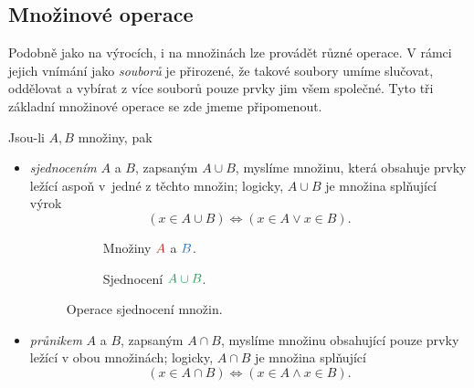 \subsection{Množinové operace}
\label{ssec:mnozinove-operace}

Podobně jako na výrocích, i na množinách lze provádět různé operace. V rámci
jejich vnímání jako \emph{souborů} je přirozené, že takové soubory umíme
slučovat, oddělovat a vybírat z více souborů pouze prvky jim všem společné. Tyto
tři základní množinové operace se zde jmeme připomenout.

Jsou-li $A,B$ množiny, pak
\begin{itemize}
 \item \emph{sjednocením} $A$ a $B$, zapsaným $A \cup B$, myslíme množinu, která
  obsahuje prvky ležící aspoň v~jedné z těchto množin; logicky, $A \cup B$ je
  množina splňující výrok
  \[
   (x \in A \cup B) \Leftrightarrow (x \in A \vee x \in B).
  \]
 \begin{figure}[ht]
  \centering
  \begin{subfigure}{.45\textwidth}
   \centering
   \caption{Množiny $\clr{A}$ a $\clb{B}$.}
   \label{subfig:sjednoceni-a}
  \end{subfigure}
  \begin{subfigure}{.45\textwidth}
   \centering
   \caption{Sjednocení $\clg{A \cup B}$.}
   \label{subfig:sjednoceni-b}
  \end{subfigure}
  \caption{Operace sjednocení množin.}
  \label{fig:sjednoceni}
 \end{figure}
 \item \emph{průnikem} $A$ a $B$, zapsaným $A \cap B$, myslíme množinu
  obsahující pouze prvky ležící v obou množinách; logicky, $A \cap B$ je množina
  splňující
  \[
   (x \in A \cap B) \Leftrightarrow (x \in A \wedge x \in B).
  \]
  \begin{figure}[ht]

\end{figure}
\end{itemize}
